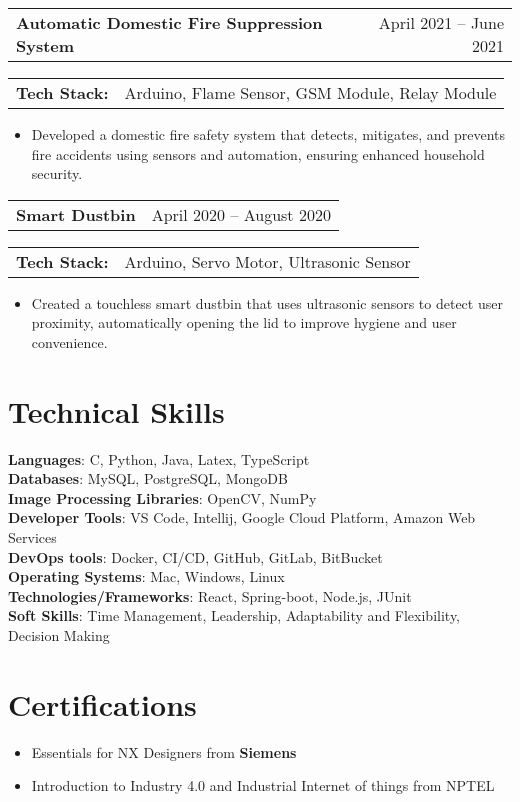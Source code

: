 \documentclass[letterpaper,11pt]{article}
\makeatletter
\newcommand{\resumeItem}[1]{
  \item\small{
    {#1 \vspace{-2pt}}
  }
}
\newcommand{\projecttitle}[2]{
  \noindent
  \begin{tabular*}{\textwidth}{l@{\extracolsep{\fill}}r}
    \textbf{\small#1} & \small#2
  \end{tabular*}
  \vspace{-15pt}
}
\newcommand{\techstack}[2]{
  \begin{tabularx}{\textwidth}{l@{\hspace{5pt}} X}
    \textbf{\small#1} & \small#2
  \end{tabularx}
  \vspace{-18pt}
}
\newcommand{\resumeItemListStart}{\begin{itemize}}
\newcommand{\resumeItemListEnd}{\end{itemize}\vspace{-5pt}}
\makeatother
\begin{document}
\projecttitle{Automatic Domestic Fire Suppression System}{April 2021 -- June 2021}

\techstack{Tech Stack:}{Arduino, Flame Sensor, GSM Module, Relay Module}

\resumeItemListStart
\resumeItem{Developed a domestic fire safety system that detects, mitigates, and prevents fire accidents using sensors and automation, ensuring enhanced household security.}
\resumeItemListEnd

\projecttitle{Smart Dustbin}{April 2020 -- August 2020}

\techstack{Tech Stack:}{Arduino, Servo Motor, Ultrasonic Sensor}

\resumeItemListStart
\resumeItem{Created a touchless smart dustbin that uses ultrasonic sensors to detect user proximity, automatically opening the lid to improve hygiene and user convenience.}
\resumeItemListEnd

\vspace{-10pt}



%
\section{Technical Skills}
\begin{itemize}[leftmargin=0.15in, label={}]
  \small{\item{
        \textbf{Languages}{: C, Python, Java, Latex, TypeScript} \\
        \textbf{Databases}{: MySQL, PostgreSQL, MongoDB} \\
        \textbf{Image Processing Libraries}{: OpenCV, NumPy} \\
        \textbf{Developer Tools}{: VS Code, Intellij, Google Cloud Platform, Amazon Web Services} \\
        \textbf{DevOps tools}{: Docker, CI/CD, GitHub, GitLab, BitBucket} \\
        \textbf{Operating Systems}{: Mac, Windows, Linux} \\
        \textbf{Technologies/Frameworks}{: React, Spring-boot, Node.js, JUnit} \\
        \textbf{Soft Skills}{: Time Management, Leadership, Adaptability and Flexibility, Decision Making} \\
        }}
\end{itemize}
\vspace{-16pt}

\section{Certifications}
\resumeItemListStart
\resumeItem{Essentials for NX Designers from \textbf{Siemens}}
\resumeItem{Introduction to Industry 4.0 and Industrial Internet of things from NPTEL}
\resumeItemListEnd
\vspace{-16pt}
\end{document}

